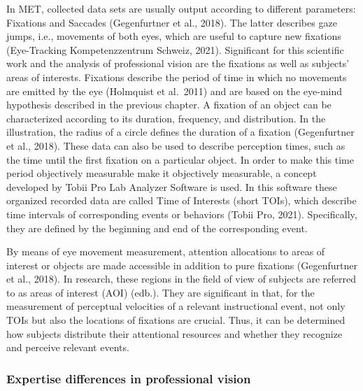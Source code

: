 \documentclass[
  man]{apa6}
\begin{document}
In MET, collected data sets are usually output according to different parameters: Fixations and Saccades (Gegenfurtner et al., 2018). The latter describes gaze jumps, i.e., movements of both eyes, which are useful to capture new fixations (Eye-Tracking Kompetenzzentrum Schweiz, 2021). Significant for this scientific work and the analysis of professional vision are the fixations as well as subjects' areas of interests. Fixations describe the period of time in which no movements are emitted by the eye (Holmquist et al.~2011) and are based on the eye-mind hypothesis described in the previous chapter. A fixation of an object can be characterized according to its duration, frequency, and distribution. In the illustration, the radius of a circle defines the duration of a fixation (Gegenfurtner et al., 2018). These data can also be used to describe perception times, such as the time until the first fixation on a particular object. In order to make this time period objectively measurable make it objectively measurable, a concept developed by Tobii Pro Lab Analyzer Software is used. In this software these organized recorded data are called Time of Interests (short TOIs), which describe time intervals of corresponding events or behaviors (Tobii Pro, 2021). Specifically, they are defined by the beginning and end of the corresponding event.

By means of eye movement measurement, attention allocations to areas of interest or objects are made accessible in addition to pure fixations (Gegenfurtner et al., 2018). In research, these regions in the field of view of subjects are referred to as areas of interest (AOI) (edb.). They are significant in that, for the measurement of perceptual velocities of a relevant instructional event, not only TOIs but also the locations of fixations are crucial. Thus, it can be determined how subjects distribute their attentional resources and whether they recognize and perceive relevant events.

\subsubsection{Expertise differences in professional vision}\label{expertise-differences-in-professional-vision}
\end{document}
